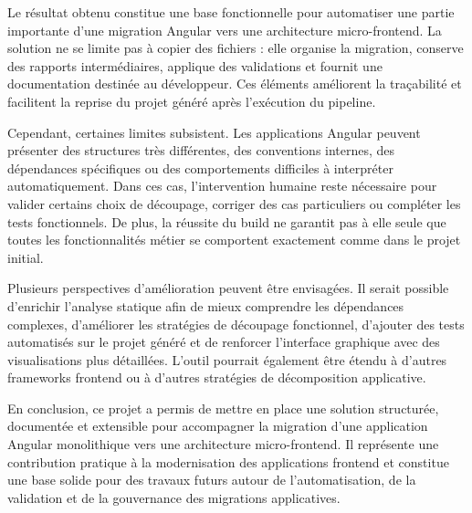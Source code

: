 Le résultat obtenu constitue une base fonctionnelle pour automatiser une partie importante d'une migration Angular vers une architecture micro-frontend. La solution ne se limite pas à copier des fichiers : elle organise la migration, conserve des rapports intermédiaires, applique des validations et fournit une documentation destinée au développeur. Ces éléments améliorent la traçabilité et facilitent la reprise du projet généré après l'exécution du pipeline.

Cependant, certaines limites subsistent. Les applications Angular peuvent présenter des structures très différentes, des conventions internes, des dépendances spécifiques ou des comportements difficiles à interpréter automatiquement. Dans ces cas, l'intervention humaine reste nécessaire pour valider certains choix de découpage, corriger des cas particuliers ou compléter les tests fonctionnels. De plus, la réussite du build ne garantit pas à elle seule que toutes les fonctionnalités métier se comportent exactement comme dans le projet initial.

Plusieurs perspectives d'amélioration peuvent être envisagées. Il serait possible d'enrichir l'analyse statique afin de mieux comprendre les dépendances complexes, d'améliorer les stratégies de découpage fonctionnel, d'ajouter des tests automatisés sur le projet généré et de renforcer l'interface graphique avec des visualisations plus détaillées. L'outil pourrait également être étendu à d'autres frameworks frontend ou à d'autres stratégies de décomposition applicative.

En conclusion, ce projet a permis de mettre en place une solution structurée, documentée et extensible pour accompagner la migration d'une application Angular monolithique vers une architecture micro-frontend. Il représente une contribution pratique à la modernisation des applications frontend et constitue une base solide pour des travaux futurs autour de l'automatisation, de la validation et de la gouvernance des migrations applicatives.
